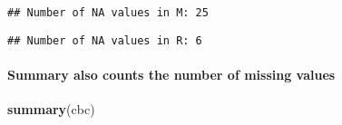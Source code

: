 \documentclass[
]{article}
\newenvironment{Shaded}{\begin{snugshade}}{\end{snugshade}}
\newcommand{\FunctionTok}[1]{\textcolor[rgb]{0.13,0.29,0.53}{\textbf{#1}}}
\newcommand{\NormalTok}[1]{#1}
\newcommand{\SpecialCharTok}[1]{\textcolor[rgb]{0.81,0.36,0.00}{\textbf{#1}}}
\newcommand{\StringTok}[1]{\textcolor[rgb]{0.31,0.60,0.02}{#1}}
\begin{document}
\begin{verbatim}
## Number of NA values in M: 25
\end{verbatim}

\begin{Shaded}
\end{Shaded}

\begin{verbatim}
## Number of NA values in R: 6
\end{verbatim}

\paragraph{Summary also counts the number of missing
values}\label{summary-also-counts-the-number-of-missing-values}

\begin{Shaded}
\begin{Highlighting}[]
\FunctionTok{summary}\NormalTok{(cbc)}
\end{Highlighting}
\end{Shaded}
\end{document}
